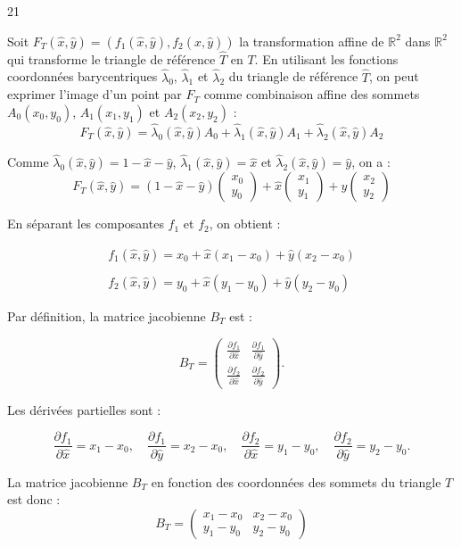 \begin{reponse}{21}

Soit $F_T(\hat{x}, \hat{y}) = (f_1(\hat{x}, \hat{y}), f_2(\hat{x}, \hat{y}))$ la transformation affine de $\mathbb{R}^2$ dans $\mathbb{R}^2$ qui transforme le triangle de référence $\hat{T}$ en $T$. En utilisant les fonctions coordonnées barycentriques $\hat{\lambda}_0$, $\hat{\lambda}_1$ et $\hat{\lambda}_2$ du triangle de référence $\hat{T}$, on peut exprimer l'image d'un point par $F_T$ comme combinaison affine des sommets $A_0(x_0, y_0)$, $A_1(x_1, y_1)$ et $A_2(x_2, y_2)$ :
$$F_T(\hat{x}, \hat{y}) = \hat{\lambda}_0(\hat{x}, \hat{y})A_0 + \hat{\lambda}_1(\hat{x}, \hat{y})A_1 + \hat{\lambda}_2(\hat{x}, \hat{y})A_2$$

Comme $\hat{\lambda}_0(\hat{x}, \hat{y}) = 1 - \hat{x} - \hat{y}$, $\hat{\lambda}_1(\hat{x}, \hat{y}) = \hat{x}$ et $\hat{\lambda}_2(\hat{x}, \hat{y}) = \hat{y}$, on a :
$$F_T(\hat{x}, \hat{y}) = (1 - \hat{x} - \hat{y}) \begin{pmatrix} x_0 \\ y_0 \end{pmatrix} + \hat{x} \begin{pmatrix} x_1 \\ y_1 \end{pmatrix} + \hat{y} \begin{pmatrix} x_2 \\ y_2 \end{pmatrix}$$

En séparant les composantes $f_1$ et $f_2$, on obtient :

\begin{align*}
    f_1(\hat{x}, \hat{y}) = x_0 + \hat{x}(x_1 - x_0) + \hat{y}(x_2 - x_0) \\ \\
    f_2(\hat{x}, \hat{y}) = y_0 + \hat{x}(y_1 - y_0) + \hat{y}(y_2 - y_0)
\end{align*}

Par définition, la matrice jacobienne $B_T$ est :

\[
    B_T = \begin{pmatrix} \frac{\partial f_1}{\partial \hat{x}} & \frac{\partial f_1}{\partial \hat{y}} \\ \frac{\partial f_2}{\partial \hat{x}} & \frac{\partial f_2}{\partial \hat{y}} \end{pmatrix}.
\]


Les dérivées partielles sont
:

\[
    \frac{\partial f_1}{\partial \hat{x}} = x_1 - x_0, \quad \frac{\partial f_1}{\partial \hat{y}} = x_2 - x_0, \quad \frac{\partial f_2}{\partial \hat{x}} = y_1 - y_0, \quad \frac{\partial f_2}{\partial \hat{y}} = y_2 - y_0.
\]

La matrice jacobienne $B_T$ en fonction des coordonnées des sommets du triangle $T$ est donc :
$$B_T = \begin{pmatrix} x_1 - x_0 & x_2 - x_0 \\ y_1 - y_0 & y_2 - y_0 \end{pmatrix}$$
\end{reponse}


